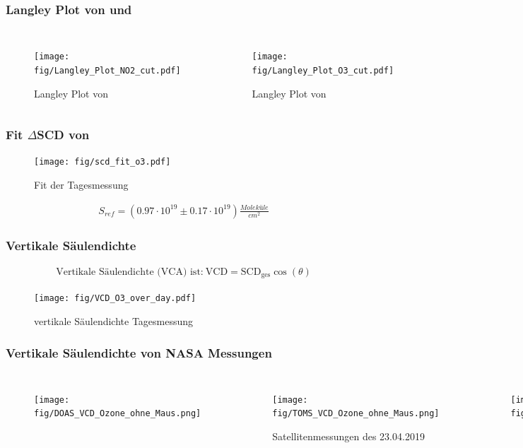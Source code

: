 \documentclass{beamer}
\begin{document}
\begin{frame}
    \frametitle{Langley Plot von  und }
    \begin{columns}
        \begin{figure}
    		\texttt{[image: fig/Langley\_Plot\_NO2\_cut.pdf]}
            \caption{Langley Plot von }   
	 	\end{figure}
 	    \begin{figure}
 	    	\texttt{[image: fig/Langley\_Plot\_O3\_cut.pdf]}
 	        \caption{Langley Plot von }
     	\end{figure} 
    \end{columns} 	
\end{frame}

\begin{frame}
    \frametitle{Fit $\Delta$SCD von }
    \begin{figure}
    	\texttt{[image: fig/scd\_fit\_o3.pdf]}
    	\caption{Fit der Tagesmessung }
    \end{figure}
	\begin{align}
		S_{ref}= (0.97 \cdot 10^{19}\pm 0.17 \cdot 10^{19}) \si{\frac{Moleküle}{cm^2}}
	\end{align}
\end{frame}

\begin{frame}
    \frametitle{Vertikale Säulendichte }
    \begin{align}
    	\text{Vertikale Säulendichte (VCA) ist:}\	\text{VCD} = \text{SCD}_\text{ges} \cos (\theta)
    \end{align}
    \vspace{-1cm}
    \begin{figure}
    	\texttt{[image: fig/VCD\_O3\_over\_day.pdf]}
		\caption{vertikale Säulendichte Tagesmessung }    
	\end{figure}
\end{frame}

\begin{frame}
	 \frametitle{Vertikale Säulendichte  von NASA Messungen}
	 \vspace{-0.35cm}
	 \begin{columns}
	 		\begin{figure}	
    			\texttt{[image: fig/DOAS\_VCD\_Ozone\_ohne\_Maus.png]}
    		\end{figure}
    	\vspace{-1cm}
    		\begin{figure}
    			\texttt{[image: fig/TOMS\_VCD\_Ozone\_ohne\_Maus.png]}
    			\caption{ Satellitenmessungen des 23.04.2019 \cite{giovanni_nasa}}
    		\end{figure}		
      		\begin{figure}	
      			\texttt{[image: fig/DOAS\_VCD\_Ozone\_legende.png]}
      		\end{figure}
	\end{columns}
\end{frame}
\end{document}
